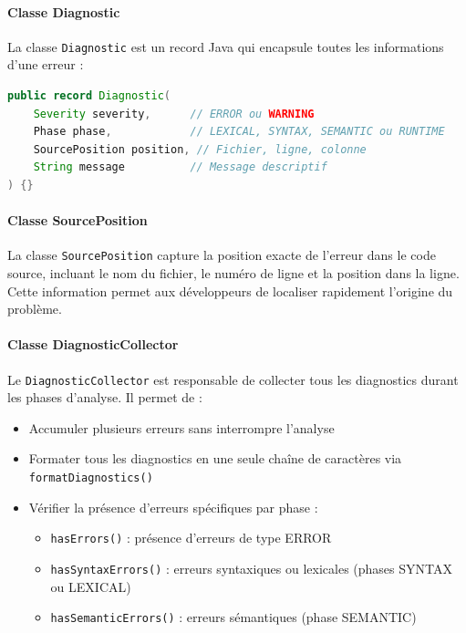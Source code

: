 \paragraph{Classe Diagnostic}
La classe \texttt{Diagnostic} est un record Java qui encapsule toutes les informations d'une erreur :

\vspace{0.3cm}
\begin{lstlisting}[language=java, caption=Structure du Diagnostic,label={lst:diagnostic-record}]
public record Diagnostic(
    Severity severity,      // ERROR ou WARNING
    Phase phase,            // LEXICAL, SYNTAX, SEMANTIC ou RUNTIME
    SourcePosition position, // Fichier, ligne, colonne
    String message          // Message descriptif
) {}
\end{lstlisting}

\paragraph{Classe SourcePosition}
La classe \texttt{SourcePosition} capture la position exacte de l'erreur dans le code source, incluant le nom du fichier, le numéro de ligne et la position dans la ligne.
Cette information permet aux développeurs de localiser rapidement l'origine du problème.

\paragraph{Classe DiagnosticCollector}
Le \texttt{DiagnosticCollector} est responsable de collecter tous les diagnostics durant les phases d'analyse.
Il permet de :
\begin{itemize}
    \item Accumuler plusieurs erreurs sans interrompre l'analyse
    \item Formater tous les diagnostics en une seule chaîne de caractères via \texttt{formatDiagnostics()}
    \item Vérifier la présence d'erreurs spécifiques par phase :
    \begin{itemize}
        \item \texttt{hasErrors()} : présence d'erreurs de type ERROR
        \item \texttt{hasSyntaxErrors()} : erreurs syntaxiques ou lexicales (phases SYNTAX ou LEXICAL)
        \item \texttt{hasSemanticErrors()} : erreurs sémantiques (phase SEMANTIC)
    \end{itemize}
\end{itemize}

